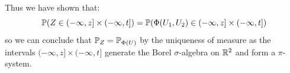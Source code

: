 Thus we have shown that:
\[\P(Z \in (-\infty,z] \times (-\infty,t]) = \P(\Phi(U_1, U_2) \in (-\infty,z] \times (-\infty, t])\]
so we can conclude that $\P_Z = \P_{\Phi(U)}$ by the uniqueness of measure as the intervals $(-\infty,z] \times (-\infty,t]$ generate the Borel $\sigma$-algebra on $\R^2$ and form a $\pi$-system.